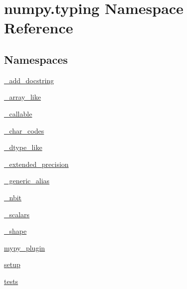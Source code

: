 \hypertarget{namespacenumpy_1_1typing}{}\section{numpy.\+typing Namespace Reference}
\label{namespacenumpy_1_1typing}
\subsection*{Namespaces}
\begin{DoxyCompactItemize}
\item 
 \hyperlink{namespacenumpy_1_1typing_1_1__add__docstring}{\+\_\+add\+\_\+docstring}
\item 
 \hyperlink{namespacenumpy_1_1typing_1_1__array__like}{\+\_\+array\+\_\+like}
\item 
 \hyperlink{namespacenumpy_1_1typing_1_1__callable}{\+\_\+callable}
\item 
 \hyperlink{namespacenumpy_1_1typing_1_1__char__codes}{\+\_\+char\+\_\+codes}
\item 
 \hyperlink{namespacenumpy_1_1typing_1_1__dtype__like}{\+\_\+dtype\+\_\+like}
\item 
 \hyperlink{namespacenumpy_1_1typing_1_1__extended__precision}{\+\_\+extended\+\_\+precision}
\item 
 \hyperlink{namespacenumpy_1_1typing_1_1__generic__alias}{\+\_\+generic\+\_\+alias}
\item 
 \hyperlink{namespacenumpy_1_1typing_1_1__nbit}{\+\_\+nbit}
\item 
 \hyperlink{namespacenumpy_1_1typing_1_1__scalars}{\+\_\+scalars}
\item 
 \hyperlink{namespacenumpy_1_1typing_1_1__shape}{\+\_\+shape}
\item 
 \hyperlink{namespacenumpy_1_1typing_1_1mypy__plugin}{mypy\+\_\+plugin}
\item 
 \hyperlink{namespacenumpy_1_1typing_1_1setup}{setup}
\item 
 \hyperlink{namespacenumpy_1_1typing_1_1tests}{tests}
\end{DoxyCompactItemize}
